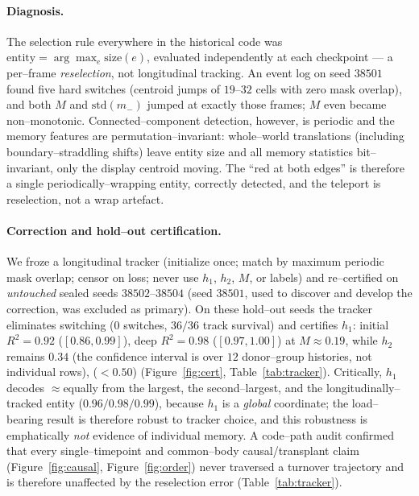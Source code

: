 \documentclass[11pt]{article}
\begin{document}
\paragraph{Diagnosis.} The selection rule everywhere in the historical code was
$\text{entity}=\arg\max_e \text{size}(e)$, evaluated independently at each checkpoint --- a per--frame
\emph{reselection}, not longitudinal tracking. An event log on seed $38501$ found five hard switches (centroid jumps
of $19$--$32$ cells with zero mask overlap), and both $M$ and $\mathrm{std}(m_-)$ jumped at exactly those frames;
$M$ even became non--monotonic. Connected--component detection, however, is periodic and the memory features are
permutation--invariant: whole--world translations (including boundary--straddling shifts) leave entity size and all
memory statistics bit--invariant, only the display centroid moving. The ``red at both edges'' is therefore a single
periodically--wrapping entity, correctly detected, and the teleport is reselection, not a wrap artefact.

\paragraph{Correction and hold--out certification.} We froze a longitudinal tracker (initialize once; match by
maximum periodic mask overlap; censor on loss; never use $h_1$, $h_2$, $M$, or labels) and re--certified on
\emph{untouched} sealed seeds $38502$--$38504$ (seed $38501$, used to discover and develop the correction, was
excluded as primary). On these hold--out seeds the tracker eliminates switching ($0$ switches, $36/36$ track
survival) and certifies $h_1$: initial $R^2=0.92$ ($[0.86,0.99]$), deep $R^2=0.98$ ($[0.97,1.00]$) at $M\approx0.19$,
while $h_2$ remains $0.34$ (the confidence interval is over $12$ donor--group histories, not individual rows), ($<0.50$) (Figure~\ref{fig:cert}, Table~\ref{tab:tracker}). Critically, $h_1$ decodes
$\approx$equally from the largest, the second--largest, and the longitudinally--tracked entity ($0.96/0.98/0.99$),
because $h_1$ is a \emph{global} coordinate; the load--bearing result is therefore robust to tracker choice, and
this robustness is emphatically \emph{not} evidence of individual memory. A code--path audit confirmed that every
single--timepoint and common--body causal/transplant claim (Figure~\ref{fig:causal}, Figure~\ref{fig:order}) never
traversed a turnover trajectory and is therefore unaffected by the reselection error (Table~\ref{tab:tracker}).
\end{document}
